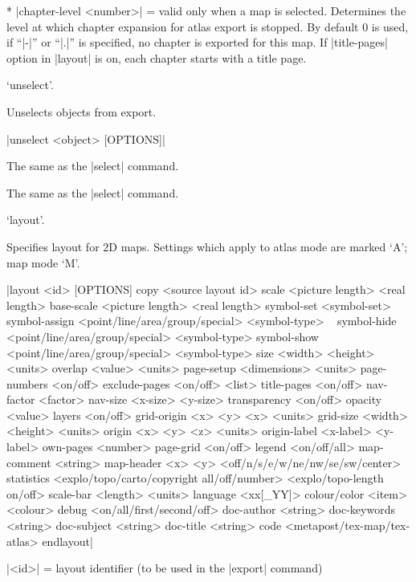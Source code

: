   * |chapter-level <number>| = valid only when a map is selected. Determines
    the level at which chapter expansion for atlas export is stopped. 
    By default 0 is used, if ``|-|'' or ``|.|'' is specified, no chapter is
    exported for this map. If |title-pages| option in |layout| is on,
    each chapter starts with a title page.
\endoptions



\subsubchapter `unselect'.

\description
  Unselects objects from export.
\enddescription

\syntax
  |unselect <object> [OPTIONS]|
\endsyntax

\arguments
  The same as the |select| command.
\endarguments

\options
  The same as the |select| command. 
\endoptions


\subsubchapter `layout'.

\description
  Specifies layout for 2D maps. Settings which apply to atlas mode
  are marked `A'; map mode `M'.
\enddescription

\syntax
|layout <id> [OPTIONS]
    copy <source layout id>
    scale <picture length> <real length>
    base-scale <picture length> <real length>
    symbol-set <symbol-set>
    symbol-assign <point/line/area/group/special> <symbol-type> \ 
                                                  <symbol-set>
    symbol-hide <point/line/area/group/special> <symbol-type>
    symbol-show <point/line/area/group/special> <symbol-type>
    size <width> <height> <units>
    overlap <value> <units>
    page-setup <dimensions> <units>
    page-numbers <on/off>
    exclude-pages <on/off> <list>
    title-pages <on/off>
    nav-factor <factor>
    nav-size <x-size> <y-size>
    transparency <on/off>
    opacity <value>
    layers <on/off>
    grid-origin <x> <y> <x> <units>
    grid-size <width> <height> <units>
    origin <x> <y> <z> <units>
    origin-label <x-label> <y-label>
    own-pages <number>
    page-grid <on/off>
    legend <on/off/all>
    map-comment <string>
    map-header <x> <y> <off/n/s/e/w/ne/nw/se/sw/center>
    statistics <explo/topo/carto/copyright all/off/number>
               <explo/topo-length on/off>
    scale-bar <length> <units>
    language <xx[_YY]>
    colour/color <item> <colour>
    debug <on/all/first/second/off>
    doc-author <string>
    doc-keywords <string>
    doc-subject <string>
    doc-title <string>
    code <metapost/tex-map/tex-atlas>
endlayout|
\endsyntax

\arguments
  |<id>| = layout identifier (to be used in the |export| command)
\endarguments

